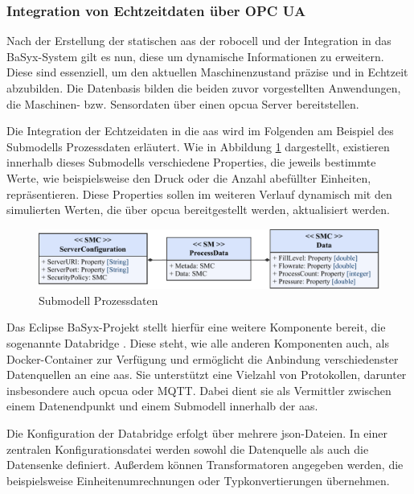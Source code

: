 \subsubsection{Integration von Echtzeitdaten über OPC UA}
Nach der Erstellung der statischen \acs{aas} der robocell und der Integration in das BaSyx-System gilt es nun, diese um dynamische Informationen zu erweitern.
Diese sind essenziell, um den aktuellen Maschinenzustand präzise und in Echtzeit abzubilden.
Die Datenbasis bilden die beiden zuvor vorgestellten Anwendungen, die Maschinen- bzw. Sensordaten über einen \acs{opcua} Server bereitstellen.

Die Integration der Echtzeidaten in die \acs{aas} wird im Folgenden am Beispiel des Submodells Prozessdaten erläutert.
Wie in Abbildung \ref{fig:SubmodellProzessdaten} dargestellt, existieren innerhalb dieses Submodells verschiedene Properties, die jeweils bestimmte Werte, wie beispielsweise den Druck oder die Anzahl abefüllter Einheiten, repräsentieren. %
Diese Properties sollen im weiteren Verlauf dynamisch mit den simulierten Werten, die über \acs{opcua} bereitgestellt werden, aktualisiert werden.

\begin{figure}[htbp]
    \centering
    \includegraphics[width=1\textwidth]{Bilder/OPCUA/SubmodellProzessdaten.pdf}
    \caption{Submodell Prozessdaten}
    \label{fig:SubmodellProzessdaten}
\end{figure}

Das Eclipse BaSyx-Projekt stellt hierfür eine weitere Komponente bereit, die sogenannte Databridge \cite{BaSyxDatabridge}.
Diese steht, wie alle anderen Komponenten auch, als Docker-Container zur Verfügung und ermöglicht die Anbindung verschiedenster Datenquellen an eine \acs{aas}.
Sie unterstützt eine Vielzahl von Protokollen, darunter insbesondere auch \acs{opcua} oder MQTT.
Dabei dient sie als Vermittler zwischen einem Datenendpunkt und einem Submodell innerhalb der \acs{aas}.

Die Konfiguration der Databridge erfolgt über mehrere \acs{json}-Dateien.
In einer zentralen Konfigurationsdatei werden sowohl die Datenquelle als auch die Datensenke definiert.
Außerdem können Transformatoren angegeben werden, die beispielsweise Einheitenumrechnungen oder Typkonvertierungen übernehmen.

